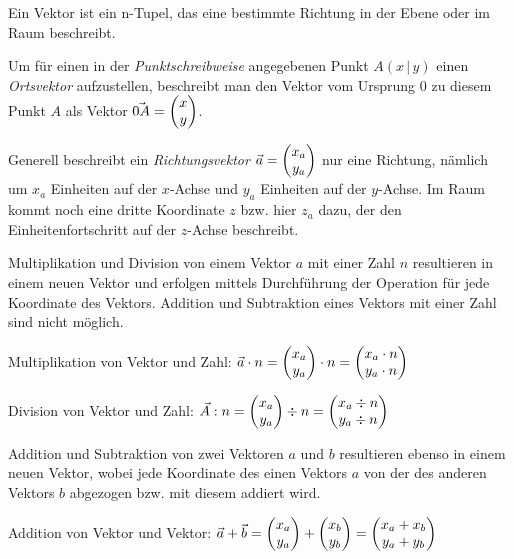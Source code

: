 



\thispagestyle{plain}

Ein Vektor ist ein n-Tupel, das eine bestimmte Richtung in der Ebene oder im Raum beschreibt.


Um f\"{u}r einen in der \emph{Punktschreibweise} angegebenen Punkt $A (x\, |\, y)$ einen \emph{Ortsvektor} aufzustellen, beschreibt man den Vektor vom Ursprung $0$ zu diesem Punkt $A$ als Vektor $\vec{0A} = \begin{pmatrix}x\\y\end{pmatrix}$.

Generell beschreibt ein \emph{Richtungsvektor} $\vec{a} = \begin{pmatrix}x_{a} \\ y_{a}\end{pmatrix}$ nur eine Richtung, n\"{a}mlich um $x_{a}$ Einheiten auf der $x$-Achse und $y_{a}$ Einheiten auf der $y$-Achse. Im Raum kommt noch eine dritte Koordinate $z$ bzw. hier $z_{a}$ dazu, der den Einheitenfortschritt auf der $z$-Achse beschreibt.



Multiplikation und Division von einem Vektor $a$ mit einer Zahl $n$ resultieren in einem neuen Vektor und erfolgen mittels Durchf\"{u}hrung der Operation f\"{u}r jede Koordinate des Vektors. Addition und Subtraktion eines Vektors mit einer Zahl sind nicht m\"{o}glich.

Multiplikation von Vektor und Zahl: $ \vec{a} \cdot n = \begin{pmatrix}x_{a}\\y_{a}\end{pmatrix} \cdot n  = \begin{pmatrix}x_{a} \cdot n \\ y_{a} \cdot n\end{pmatrix}$

Division von Vektor und Zahl: $ \vec{A} : n = \begin{pmatrix}x_{a}\\y_{a}\end{pmatrix} \div n = \begin{pmatrix}x_{a} \div n \\ y_{a} \div n\end{pmatrix}$


Addition und Subtraktion von zwei Vektoren $a$ und $b$ resultieren ebenso in einem neuen Vektor, wobei jede Koordinate des einen Vektors $a$ von der des anderen Vektors $b$ abgezogen bzw. mit diesem addiert wird.

Addition von Vektor und Vektor: $\vec{a} + \vec{b} = \begin{pmatrix}x_{a}\\y_{a}\end{pmatrix} + \begin{pmatrix}x_{b}\\y_{b}\end{pmatrix} = \begin{pmatrix}x_{a} + x_{b} \\ y_{a} + y_{b}\end{pmatrix}$

